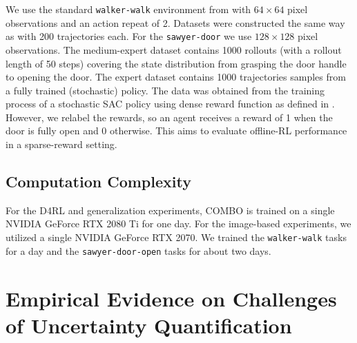 We use the standard \texttt{walker-walk} environment from \citet{tassa2018deepmind} with $64\times64$ pixel observations and an action repeat of 2. Datasets were constructed the same way as \citet{fu2020d4rl} with 200 trajectories each. For the \texttt{sawyer-door} we use $128\times128$ pixel observations. The medium-expert dataset contains 1000 rollouts (with a rollout length of 50 steps) covering the state distribution from grasping the door handle to opening the door. The expert dataset contains 1000 trajectories samples from a fully trained (stochastic) policy. The data was obtained from the training process of a stochastic SAC policy using dense reward function as defined in \citet{yu2020meta}. However, we relabel the rewards, so an agent receives a reward of 1 when the door is fully open and 0 otherwise. This aims to evaluate offline-RL performance in a sparse-reward setting. 

\subsection{Computation Complexity}

For the D4RL and generalization experiments, COMBO is trained on a single NVIDIA GeForce RTX 2080 Ti for one day. For the image-based experiments, we utilized a single NVIDIA GeForce RTX 2070. We trained the \texttt{walker-walk} tasks for a day and the \texttt{sawyer-door-open} tasks for about two days.

\section{Empirical Evidence on Challenges of Uncertainty Quantification}
\label{app:uq}

